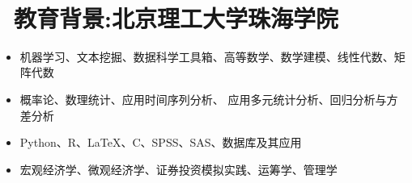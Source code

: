 \documentclass{resume}
\begin{document}
\begin{figure}[h]
\begin{minipage}[h]{0.4\linewidth}
\begin{spacing}{1.5}
\begin{tabular*}{\textwidth}{l@{\extracolsep{\fill}}r}
\end{tabular*}
\end{spacing}
\end{minipage} 
\qquad
\begin{minipage}[h]{0.55\linewidth}
\end{minipage}
\end{figure}
\vspace{0.05mm}

\section{\faGraduationCap\  教育背景:北京理工大学珠海学院}
\begin{itemize}[parsep=0.5ex]
  \item 机器学习、文本挖掘、数据科学工具箱、高等数学、数学建模、线性代数、矩阵代数
  \item 概率论、数理统计、应用时间序列分析、
应用多元统计分析、回归分析与方差分析
  \item Python、R、LaTeX、C、SPSS、SAS、数据库及其应用
  \item 宏观经济学、微观经济学、证券投资模拟实践、运筹学、管理学
\end{itemize}
\end{document}
